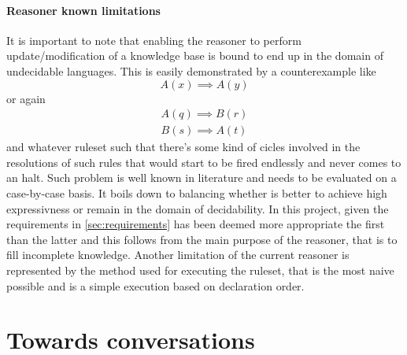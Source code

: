 \paragraph{Reasoner known limitations}
It is important to note that enabling the reasoner to perform update/modification of a knowledge base is bound to end up in the domain of undecidable languages. This is easily demonstrated by a counterexample like
\begin{equation}
  A(x)\implies A(y)
\end{equation}
or again
\begin{equation}
  \begin{gathered}
    A(q)\implies B(r) \\
    B(s)\implies A(t)
  \end{gathered}
\end{equation}
and whatever ruleset such that there's some kind of cicles involved in the resolutions of such rules that would start to be fired endlessly and never comes to an halt. Such problem is well known in literature and needs to be evaluated on a case-by-case basis. It boils down to balancing whether is better to achieve high expressivness or remain in the domain of decidability. In this project, given the requirements in \autoref{sec:requirements} has been deemed more appropriate the first than the latter and this follows from the main purpose of the reasoner, that is to fill incomplete knowledge. Another limitation of the current reasoner is represented by the method used for executing the ruleset, that is the most naive possible and is a simple execution based on declaration order.

\section{Towards conversations}\label{sec:conversational_interface}
